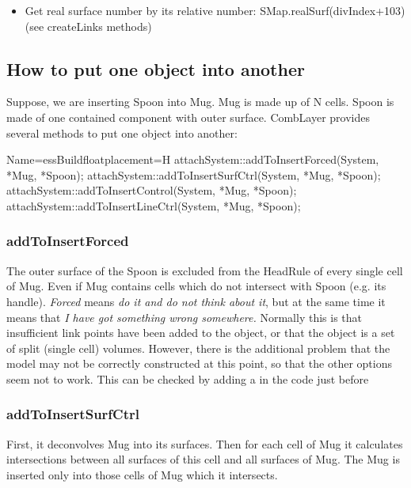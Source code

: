\begin{itemize}
\item Get real surface number by its relative number: SMap.realSurf(divIndex+103) (see createLinks methods)
\end{itemize}

\subsection{How to put one object into another}

Suppose, we are inserting Spoon into Mug.
Mug is made up of N cells. Spoon is made of one contained component with outer surface.
CombLayer provides several methods to put one object into another:

\begin{cpp}{Name=essBuild}{floatplacement=H}
attachSystem::addToInsertForced(System,   *Mug, *Spoon);
attachSystem::addToInsertSurfCtrl(System, *Mug, *Spoon);
attachSystem::addToInsertControl(System,  *Mug, *Spoon);
attachSystem::addToInsertLineCtrl(System, *Mug, *Spoon);
\end{cpp}

\subsubsection{addToInsertForced}

The outer surface of the Spoon is excluded from the HeadRule of every single cell of Mug.
Even if Mug contains cells which do not intersect with Spoon (e.g. its handle).
{\it Forced} means {\it do it and do not think about it}, but at the same time it means that
{\it I have got something wrong somewhere.}  Normally this is that insufficient link points have been added
to the object, or that the object is a set of split (single cell) volumes.  However, there is the additional
problem that the model may not be correctly constructed at this point, so that the other options seem not to work.
This can be checked by adding a
in the code just before


\subsubsection{addToInsertSurfCtrl}
First, it deconvolves Mug into its surfaces.
Then for each cell of Mug it calculates intersections between all surfaces of this cell and all surfaces of Mug.
The Mug is inserted only into those cells of Mug which it intersects.

